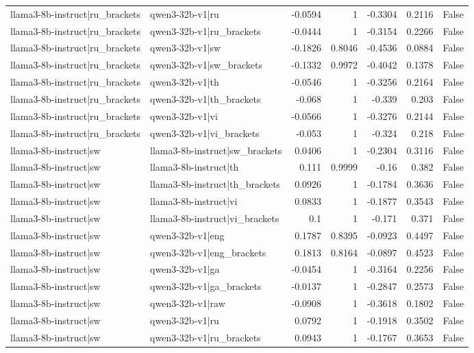 \begin{table}
\begin{tabular}{l l r r r r l}
llama3-8b-instruct|ru_brackets & qwen3-32b-v1|ru & -0.0594 & 1 & -0.3304 & 0.2116 & False \\
llama3-8b-instruct|ru_brackets & qwen3-32b-v1|ru_brackets & -0.0444 & 1 & -0.3154 & 0.2266 & False \\
llama3-8b-instruct|ru_brackets & qwen3-32b-v1|sw & -0.1826 & 0.8046 & -0.4536 & 0.0884 & False \\
llama3-8b-instruct|ru_brackets & qwen3-32b-v1|sw_brackets & -0.1332 & 0.9972 & -0.4042 & 0.1378 & False \\
llama3-8b-instruct|ru_brackets & qwen3-32b-v1|th & -0.0546 & 1 & -0.3256 & 0.2164 & False \\
llama3-8b-instruct|ru_brackets & qwen3-32b-v1|th_brackets & -0.068 & 1 & -0.339 & 0.203 & False \\
llama3-8b-instruct|ru_brackets & qwen3-32b-v1|vi & -0.0566 & 1 & -0.3276 & 0.2144 & False \\
llama3-8b-instruct|ru_brackets & qwen3-32b-v1|vi_brackets & -0.053 & 1 & -0.324 & 0.218 & False \\
llama3-8b-instruct|sw & llama3-8b-instruct|sw_brackets & 0.0406 & 1 & -0.2304 & 0.3116 & False \\
llama3-8b-instruct|sw & llama3-8b-instruct|th & 0.111 & 0.9999 & -0.16 & 0.382 & False \\
llama3-8b-instruct|sw & llama3-8b-instruct|th_brackets & 0.0926 & 1 & -0.1784 & 0.3636 & False \\
llama3-8b-instruct|sw & llama3-8b-instruct|vi & 0.0833 & 1 & -0.1877 & 0.3543 & False \\
llama3-8b-instruct|sw & llama3-8b-instruct|vi_brackets & 0.1 & 1 & -0.171 & 0.371 & False \\
llama3-8b-instruct|sw & qwen3-32b-v1|eng & 0.1787 & 0.8395 & -0.0923 & 0.4497 & False \\
llama3-8b-instruct|sw & qwen3-32b-v1|eng_brackets & 0.1813 & 0.8164 & -0.0897 & 0.4523 & False \\
llama3-8b-instruct|sw & qwen3-32b-v1|ga & -0.0454 & 1 & -0.3164 & 0.2256 & False \\
llama3-8b-instruct|sw & qwen3-32b-v1|ga_brackets & -0.0137 & 1 & -0.2847 & 0.2573 & False \\
llama3-8b-instruct|sw & qwen3-32b-v1|raw & -0.0908 & 1 & -0.3618 & 0.1802 & False \\
llama3-8b-instruct|sw & qwen3-32b-v1|ru & 0.0792 & 1 & -0.1918 & 0.3502 & False \\
llama3-8b-instruct|sw & qwen3-32b-v1|ru_brackets & 0.0943 & 1 & -0.1767 & 0.3653 & False \\

\end{tabular}
\end{table}
